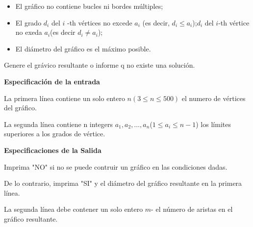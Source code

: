 \documentclass[10pt]{article}
\begin{document}
    \begin{itemize}
        \item El gr\'afico no contiene bucles ni bordes m\'ultiples;
        \item El grado $d_i$ del $i$ -th v\'ertices no excede $a_i$ (es decir, $d_i\le a_i$);$d_i$ del $i$-th v\'ertice no exeda $a_i$(es decir $d_i \neq a_i$);
        \item El di\'ametro del gr\'afico es el m\'aximo posible.
    \end{itemize}
    
    \begin{flushleft}
       Genere el gr\'avico resultante o informe q no existe una soluci\'on.
    \end{flushleft}

    \begin{flushleft}
        {\bf Especificaci\'on de la entrada }
    \end{flushleft}

    \begin{flushleft}
       La primera l\'inea contiene un solo entero $n(3\leq n \leq 500) $ el numero de v\'ertices del gr\'afico. 
    \end{flushleft}

    \begin{flushleft}
        La segunda l\'inea contiene n integers $a_1,a_2,\dots,a_n$($1\leq a_i \leq n-1$) los l\'imites superiores a los grados de v\'ertice.
    \end{flushleft}

    \begin{flushleft}
        {\bf Especificaciones de la Salida}
    \end{flushleft}

    \begin{flushleft}
        Imprima "NO" si no se puede contruir un gr\'afico en las condiciones dadas.
    \end{flushleft}
    
    \begin{flushleft}
        De lo contrario, imprima "SI" y el di\'ametro del gr\'afico resultante en la primera l\'inea.
    \end{flushleft}
    
    \begin{flushleft}
        La segunda l\'inea debe contener un solo entero $m$- el n\'umero de aristas en el gr\'afico resultante.
    \end{flushleft}
\end{document}
